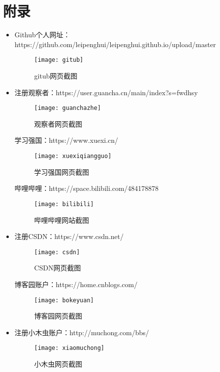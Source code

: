 \documentclass{article}
\begin{document}
\section{附录}
\begin{itemize}
    \item Github个人网址：https://github.com/leipenghui/leipenghui.github.io/upload/master
     \begin{figure}[H]
    \centering
    \texttt{[image: gitub]}
    \caption{gitub网页截图}
    \label{fig:1}
      \end{figure}
    \item 注册观察者：https://user.guancha.cn/main/index?s=fwdhsy
    \begin{figure}[H]
    	\centering
    	\texttt{[image: guanchazhe]}
    	\caption{观察者网页截图}
    	\label{fig:3}
    \end{figure}
    学习强国：https://www.xuexi.cn/
    \begin{figure}[H]
    	\centering
    	\texttt{[image: xuexiqiangguo]}
    	\caption{学习强国网页截图}
    	\label{fig:4}
    \end{figure}
    哔哩哔哩：https://space.bilibili.com/484178878
    \begin{figure}[H]
    	\centering
    	\texttt{[image: bilibili]}
    	\caption{哔哩哔哩网站截图}
    	\label{fig:5}
    \end{figure}
    \item 注册CSDN：https://www.csdn.net/
    \begin{figure}[H]
    	\centering
    	\texttt{[image: csdn]}
    	\caption{CSDN网页截图}
    	\label{fig:6}
    \end{figure}
    博客园账户：https://home.cnblogs.com/
    \begin{figure}[H]
    	\centering
    	\texttt{[image: bokeyuan]}
    	\caption{博客园网页截图}
    	\label{fig:7}
    \end{figure}
    \item 注册小木虫账户：http://muchong.com/bbs/
     \begin{figure}[H]
    	\centering
    	\texttt{[image: xiaomuchong]}
    	\caption{小木虫网页截图}
    	\label{fig:8}
    \end{figure}
\end{itemize}


\hspace*{\fill} \\




\end{document}
